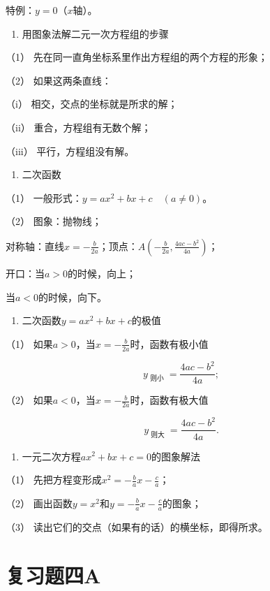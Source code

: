 特例：\(y = 0\)（\(x\)轴）。

\begin{enumerate}[start=3]
\item
  用图象法解二元一次方程组的步骤
\end{enumerate}

（1） 先在同一直角坐标系里作出方程组的两个方程的形象；

（2） 如果这两条直线：

（i） 相交，交点的坐标就是所求的解；

（ii） 重合，方程组有无数个解；

（iii） 平行，方程组没有解。

\begin{enumerate}[start=4]
\item
  二次函数
\end{enumerate}

（1） 一般形式：\(y = ax^2 + bx + c \quad (a \neq 0)\)。

（2） 图象：抛物线；

对称轴：直线\(x = -\frac{b}{2a}\)；顶点：\(A\left(-\frac{b}{2a}, \frac{4ac - b^2}{4a}\right)\)；

开口：当\(a > 0\)的时候，向上；

当\(a < 0\)的时候，向下。

\begin{enumerate}[start=5]
\item
  二次函数\(y = ax^2 + bx + c\)的极值
\end{enumerate}

（1） 如果\(a > 0\)，当\(x = -\frac{b}{2a}\)时，函数有极小值

\[
y_{\text{ 则小 }} = \frac{4 a c - b^{2}}{4 a};
\]

（2） 如果\(a < 0\)，当\(x = -\frac{b}{2a}\)时，函数有极大值

\[
y_{\text{ 则大 }} = \frac{4 a c - b^{2}}{4 a}.
\]

\begin{enumerate}[start=6]
\item
  一元二次方程\(ax^2 + bx + c = 0\)的图象解法
\end{enumerate}

（1） 先把方程变形成\(x^{2}=-\frac{b}{a}x-\frac{c}{a}\)；

（2） 画出函数\(y = x^2\)和\(y = -\frac{b}{a} x - \frac{c}{a}\)的图象；

（3） 读出它们的交点（如果有的话）的横坐标，即得所求。

\section{复习题四A}

